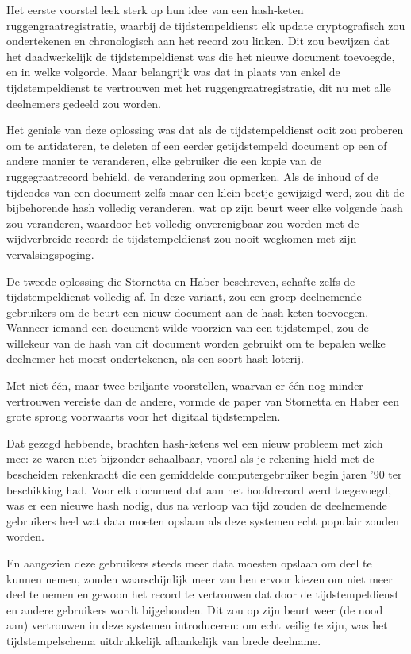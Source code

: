 \documentclass[
  a5paper,
  smalldemyvopaper,11pt,twoside,onecolumn,openright,extrafontsizes,
hidelinks]{memoir}
\begin{document}
Het eerste voorstel leek sterk op hun idee van een hash-keten
ruggengraatregistratie, waarbij de tijdstempeldienst elk update
cryptografisch zou ondertekenen en chronologisch aan het record zou
linken. Dit zou bewijzen dat het daadwerkelijk de tijdstempeldienst was
die het nieuwe document toevoegde, en in welke volgorde. Maar belangrijk
was dat in plaats van enkel de tijdstempeldienst te vertrouwen met het
ruggengraatregistratie, dit nu met alle deelnemers gedeeld zou worden.

Het geniale van deze oplossing was dat als de tijdstempeldienst ooit zou
proberen om te antidateren, te deleten of een eerder getijdstempeld
document op een of andere manier te veranderen, elke gebruiker die een
kopie van de ruggegraatrecord behield, de verandering zou opmerken. Als
de inhoud of de tijdcodes van een document zelfs maar een klein beetje
gewijzigd werd, zou dit de bijbehorende hash volledig veranderen, wat op
zijn beurt weer elke volgende hash zou veranderen, waardoor het volledig
onverenigbaar zou worden met de wijdverbreide record: de
tijdstempeldienst zou nooit wegkomen met zijn vervalsingspoging.

De tweede oplossing die Stornetta en Haber beschreven, schafte zelfs de
tijdstempeldienst volledig af. In deze variant, zou een groep
deelnemende gebruikers om de beurt een nieuw document aan de hash-keten
toevoegen. Wanneer iemand een document wilde voorzien van een
tijdstempel, zou de willekeur van de hash van dit document worden
gebruikt om te bepalen welke deelnemer het moest ondertekenen, als een
soort hash-loterij.

Met niet één, maar twee briljante voorstellen, waarvan er één nog minder
vertrouwen vereiste dan de andere, vormde de paper van Stornetta en
Haber een grote sprong voorwaarts voor het digitaal tijdstempelen.

Dat gezegd hebbende, brachten hash-ketens wel een nieuw probleem met
zich mee: ze waren niet bijzonder schaalbaar, vooral als je rekening
hield met de bescheiden rekenkracht die een gemiddelde computergebruiker
begin jaren '90 ter beschikking had. Voor elk document dat aan het
hoofdrecord werd toegevoegd, was er een nieuwe hash nodig, dus na
verloop van tijd zouden de deelnemende gebruikers heel wat data moeten
opslaan als deze systemen echt populair zouden worden.

En aangezien deze gebruikers steeds meer data moesten opslaan om deel te
kunnen nemen, zouden waarschijnlijk meer van hen ervoor kiezen om niet
meer deel te nemen en gewoon het record te vertrouwen dat door de
tijdstempeldienst en andere gebruikers wordt bijgehouden. Dit zou op
zijn beurt weer (de nood aan) vertrouwen in deze systemen introduceren:
om echt veilig te zijn, was het tijdstempelschema uitdrukkelijk
afhankelijk van brede deelname.
\end{document}
